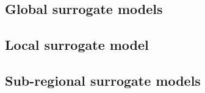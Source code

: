 \subsection{Global surrogate models}

\subsection{Local surrogate model}

\subsection{Sub-regional surrogate models}
